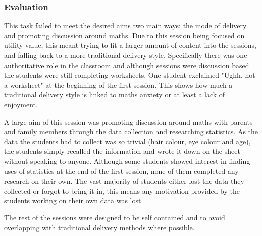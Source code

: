 \documentclass[11pt, a4paper, notitlepage]{article}
\begin{document}
\subsubsection*{Evaluation}
This task failed to meet the desired aims two main ways: the mode of delivery and promoting discussion around maths. Due to this session being focused on utility value, this meant trying to fit a larger amount of content into the sessions, and falling back to a more traditional delivery style. Specifically there was one authoritative role in the classroom and although sessions were discussion based the students were still completing worksheets. One student exclaimed "Ughh, not a worksheet" at the beginning of the first session. This shows how much a traditional delivery style is linked to maths anxiety or at least a lack of enjoyment.
\par
A large aim of this session was promoting discussion around maths with parents and family members through the data collection and researching statistics. As the data the students had to collect was so trivial (hair colour, eye colour and age), the students simply recalled the information and wrote it down on the sheet without speaking to anyone. Although some students showed interest in finding uses of statistics at the end of the first session, none of them completed any research on their own. The vast majority of students either lost the data they collected or forgot to bring it in, this means any motivation provided by the students working on their own data was lost.
\par
The rest of the sessions were designed to be self contained and to avoid overlapping with traditional delivery methods where possible.
\end{document}

